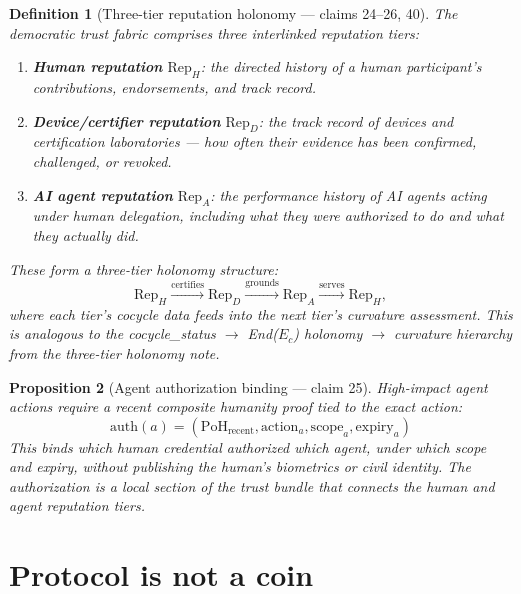 \documentclass[11pt,a4paper]{article}
\newtheorem{definition}{Definition}[section]
\newtheorem{proposition}[definition]{Proposition}
\begin{document}
\begin{definition}[Three-tier reputation holonomy --- claims 24--26, 40]
\label{def:three-tier}
The democratic trust fabric comprises three interlinked reputation tiers:
\begin{enumerate}
\item \textbf{Human reputation} $\text{Rep}_H$: the directed history of
  a human participant's contributions, endorsements, and track record.
\item \textbf{Device/certifier reputation} $\text{Rep}_D$: the track
  record of devices and certification laboratories --- how often their
  evidence has been confirmed, challenged, or revoked.
\item \textbf{AI agent reputation} $\text{Rep}_A$: the performance
  history of AI agents acting under human delegation, including what
  they were authorized to do and what they actually did.
\end{enumerate}
These form a three-tier holonomy structure:
\[
  \text{Rep}_H \xrightarrow{\text{certifies}} \text{Rep}_D
  \xrightarrow{\text{grounds}} \text{Rep}_A
  \xrightarrow{\text{serves}} \text{Rep}_H,
\]
where each tier's cocycle data feeds into the next tier's curvature
assessment. This is analogous to the cocycle\_status $\to$ End($E_c$)
holonomy $\to$ curvature hierarchy from the three-tier holonomy note.
\end{definition}

\begin{proposition}[Agent authorization binding --- claim 25]
\label{prop:agent-auth}
High-impact agent actions require a recent composite humanity proof
tied to the exact action:
\[
  \text{auth}(a) = (\text{PoH}_{\text{recent}}, \text{action}_a,
  \text{scope}_a, \text{expiry}_a)
\]
This binds which human credential authorized which agent, under which
scope and expiry, without publishing the human's biometrics or civil
identity. The authorization is a local section of the trust bundle
that connects the human and agent reputation tiers.
\end{proposition}

\section{Protocol is not a coin}
\label{sec:not-coin}
\end{document}
